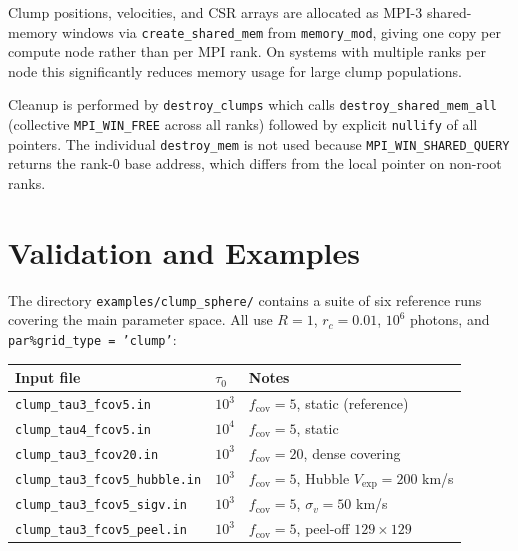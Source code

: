 \documentclass[english,a4paper]{my_memo}
\begin{document}
\begin{sloppypar}
Clump positions, velocities, and CSR arrays are allocated as MPI-3
shared-memory windows via \texttt{create\_shared\_mem} from
\texttt{memory\_mod}, giving one copy per compute node rather than per MPI
rank.  On systems with multiple ranks per node this significantly reduces
memory usage for large clump populations.
\end{sloppypar}

\begin{sloppypar}
Cleanup is performed by \texttt{destroy\_clumps} which calls
\texttt{destroy\_shared\_mem\_all} (collective \texttt{MPI\_WIN\_FREE} across
all ranks) followed by explicit \texttt{nullify} of all pointers.  The
individual \texttt{destroy\_mem} is not used because
\texttt{MPI\_WIN\_SHARED\_QUERY} returns the rank-0 base address, which
differs from the local pointer on non-root ranks.
\end{sloppypar}

\section{Validation and Examples}

\begin{sloppypar}
The directory \texttt{examples/clump\_sphere/} contains a suite of six
reference runs covering the main parameter space.  All use $R=1$, $r_c=0.01$,
$10^6$ photons, and \texttt{par\%grid\_type = 'clump'}:
\end{sloppypar}

\begin{center}
\begin{tabular}{lll}
\hline
Input file & $\tau_0$ & Notes \\
\hline
\texttt{clump\_tau3\_fcov5.in}        & $10^3$ & $f_\mathrm{cov}=5$, static (reference) \\
\texttt{clump\_tau4\_fcov5.in}        & $10^4$ & $f_\mathrm{cov}=5$, static \\
\texttt{clump\_tau3\_fcov20.in}       & $10^3$ & $f_\mathrm{cov}=20$, dense covering \\
\texttt{clump\_tau3\_fcov5\_hubble.in}& $10^3$ & $f_\mathrm{cov}=5$, Hubble $V_\mathrm{exp}=200$ km/s \\
\texttt{clump\_tau3\_fcov5\_sigv.in}  & $10^3$ & $f_\mathrm{cov}=5$, $\sigma_v=50$ km/s \\
\texttt{clump\_tau3\_fcov5\_peel.in}  & $10^3$ & $f_\mathrm{cov}=5$, peel-off $129\times129$ \\
\hline
\end{tabular}
\end{center}
\end{document}
